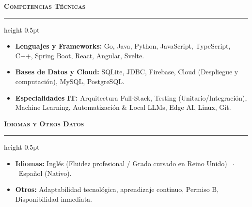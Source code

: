 \documentclass[10pt,a4paper]{article}
\newcommand{\cvsection}[1]{%
  \vspace{0.45em}%
  {\large\textbf{\textsc{#1}}}\\[-0.5em]%
  {\color{primary}\hrule height 0.5pt}%
  \vspace{0.35em}%
}
\begin{document}
\cvsection{Competencias Técnicas}
\begin{itemize}[leftmargin=1.2em, itemsep=1.2pt, topsep=1.5pt]
  \item \textbf{Lenguajes y Frameworks:} Go, Java, Python, JavaScript, TypeScript, C++, Spring Boot, React, Angular, Svelte.
  \item \textbf{Bases de Datos y Cloud:} SQLite, JDBC, Firebase, Cloud (Despliegue y computación), MySQL, PostgreSQL.
  \item \textbf{Especialidades IT:} Arquitectura Full-Stack, Testing (Unitario/Integración), Machine Learning, Automatización \& Local LLMs, Edge AI, Linux, Git.
\end{itemize}

\cvsection{Idiomas y Otros Datos}
\begin{itemize}[leftmargin=1.2em, itemsep=1.2pt, topsep=1.5pt]
  \item \textbf{Idiomas:} Inglés (Fluidez profesional / Grado cursado en Reino Unido) \ $\cdot$ \ Español (Nativo).
  \item \textbf{Otros:} Adaptabilidad tecnológica, aprendizaje continuo, Permiso B, Disponibilidad inmediata.
\end{itemize}
\end{document}
